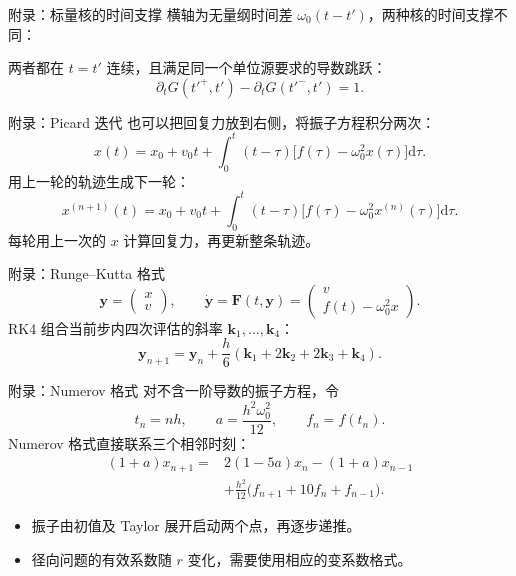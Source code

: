 \documentclass[aspectratio=169,11pt]{beamer}
\newcommand{\dd}{\mathrm d}
\begin{document}
\begin{frame}{附录：标量核的时间支撑}
横轴为无量纲时间差 $\omega_0(t-t')$，两种核的时间支撑不同：
\begin{center}
\end{center}
两者都在 $t=t'$ 连续，且满足同一个单位源要求的导数跳跃：
\[
\partial_tG(t'^+,t')-\partial_tG(t'^-,t')=1.
\]
\end{frame}

\begin{frame}{附录：Picard 迭代}
也可以把回复力放到右侧，将振子方程积分两次：
\[
x(t)=x_0+v_0t+\int_0^t(t-\tau)
\bigl[f(\tau)-\omega_0^2x(\tau)\bigr]\dd\tau.
\]
用上一轮的轨迹生成下一轮：
\[
x^{(n+1)}(t)=x_0+v_0t+\int_0^t(t-\tau)
\bigl[f(\tau)-\omega_0^2x^{(n)}(\tau)\bigr]\dd\tau.
\]
每轮用上一次的 $x$ 计算回复力，再更新整条轨迹。
\end{frame}

\begin{frame}{附录：Runge--Kutta 格式}
\[
\bm y=\begin{pmatrix}x\\v\end{pmatrix},\qquad
\dot{\bm y}=\bm F(t,\bm y)
=\begin{pmatrix}v\\f(t)-\omega_0^2x\end{pmatrix}.
\]
RK4 组合当前步内四次评估的斜率 $\bm k_1,\ldots,\bm k_4$：
\[
\bm y_{n+1}=\bm y_n+\frac h6
(\bm k_1+2\bm k_2+2\bm k_3+\bm k_4).
\]
\end{frame}

\begin{frame}{附录：Numerov 格式}
对不含一阶导数的振子方程，令
\[
t_n=nh,\qquad a=\frac{h^2\omega_0^2}{12},\qquad f_n=f(t_n).
\]
Numerov 格式直接联系三个相邻时刻：
\[
\begin{aligned}
(1+a)x_{n+1}={}&2(1-5a)x_n-(1+a)x_{n-1}\\
&+\frac{h^2}{12}\bigl(f_{n+1}+10f_n+f_{n-1}\bigr).
\end{aligned}
\]
\begin{itemize}
\item 振子由初值及 Taylor 展开启动两个点，再逐步递推。
\item 径向问题的有效系数随 $r$ 变化，需要使用相应的变系数格式。
\end{itemize}
\end{frame}
\end{document}
